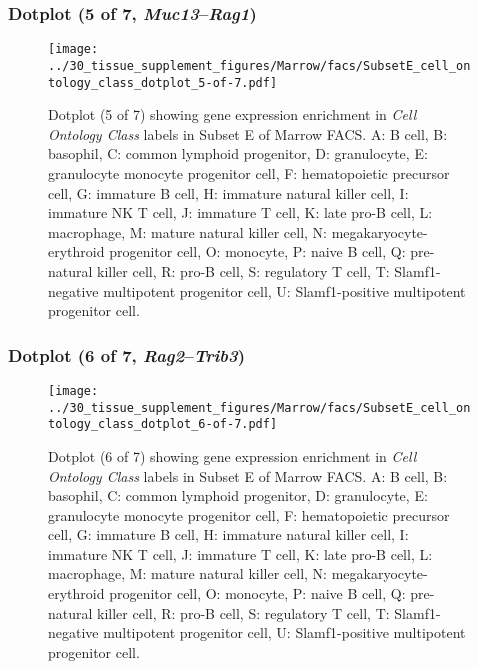 \subsubsection{Dotplot (5 of 7, \emph{Muc13}--\emph{Rag1})}
\begin{figure}[h]
\centering
\texttt{[image: ../30\_tissue\_supplement\_figures/Marrow/facs/SubsetE\_cell\_ontology\_class\_dotplot\_5-of-7.pdf]}

\caption{ Dotplot (5 of 7)  showing gene expression enrichment in \emph{Cell Ontology Class} labels in Subset E of Marrow FACS. A: B cell, B: basophil, C: common lymphoid progenitor, D: granulocyte, E: granulocyte monocyte progenitor cell, F: hematopoietic precursor cell, G: immature B cell, H: immature natural killer cell, I: immature NK T cell, J: immature T cell, K: late pro-B cell, L: macrophage, M: mature natural killer cell, N: megakaryocyte-erythroid progenitor cell, O: monocyte, P: naive B cell, Q: pre-natural killer cell, R: pro-B cell, S: regulatory T cell, T: Slamf1-negative multipotent progenitor cell, U: Slamf1-positive multipotent progenitor cell.}
\end{figure}


\clearpage

\subsubsection{Dotplot (6 of 7, \emph{Rag2}--\emph{Trib3})}
\begin{figure}[h]
\centering
\texttt{[image: ../30\_tissue\_supplement\_figures/Marrow/facs/SubsetE\_cell\_ontology\_class\_dotplot\_6-of-7.pdf]}

\caption{ Dotplot (6 of 7)  showing gene expression enrichment in \emph{Cell Ontology Class} labels in Subset E of Marrow FACS. A: B cell, B: basophil, C: common lymphoid progenitor, D: granulocyte, E: granulocyte monocyte progenitor cell, F: hematopoietic precursor cell, G: immature B cell, H: immature natural killer cell, I: immature NK T cell, J: immature T cell, K: late pro-B cell, L: macrophage, M: mature natural killer cell, N: megakaryocyte-erythroid progenitor cell, O: monocyte, P: naive B cell, Q: pre-natural killer cell, R: pro-B cell, S: regulatory T cell, T: Slamf1-negative multipotent progenitor cell, U: Slamf1-positive multipotent progenitor cell.}
\end{figure}


\clearpage

